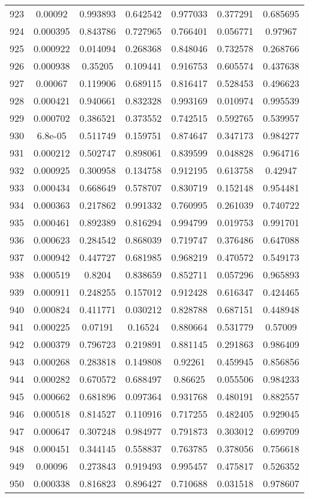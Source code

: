 \begin{table}
\begin{tabular}{c|c|c|c|c|c|c}
923 & 0.00092 & 0.993893 & 0.642542 & 0.977033 & 0.377291 & 0.685695\\
924 & 0.000395 & 0.843786 & 0.727965 & 0.766401 & 0.056771 & 0.97967\\
925 & 0.000922 & 0.014094 & 0.268368 & 0.848046 & 0.732578 & 0.268766\\
926 & 0.000938 & 0.35205 & 0.109441 & 0.916753 & 0.605574 & 0.437638\\
927 & 0.00067 & 0.119906 & 0.689115 & 0.816417 & 0.528453 & 0.496623\\
928 & 0.000421 & 0.940661 & 0.832328 & 0.993169 & 0.010974 & 0.995539\\
929 & 0.000702 & 0.386521 & 0.373552 & 0.742515 & 0.592765 & 0.539957\\
930 & 6.8e-05 & 0.511749 & 0.159751 & 0.874647 & 0.347173 & 0.984277\\
931 & 0.000212 & 0.502747 & 0.898061 & 0.839599 & 0.048828 & 0.964716\\
932 & 0.000925 & 0.300958 & 0.134758 & 0.912195 & 0.613758 & 0.42947\\
933 & 0.000434 & 0.668649 & 0.578707 & 0.830719 & 0.152148 & 0.954481\\
934 & 0.000363 & 0.217862 & 0.991332 & 0.760995 & 0.261039 & 0.740722\\
935 & 0.000461 & 0.892389 & 0.816294 & 0.994799 & 0.019753 & 0.991701\\
936 & 0.000623 & 0.284542 & 0.868039 & 0.719747 & 0.376486 & 0.647088\\
937 & 0.000942 & 0.447727 & 0.681985 & 0.968219 & 0.470572 & 0.549173\\
938 & 0.000519 & 0.8204 & 0.838659 & 0.852711 & 0.057296 & 0.965893\\
939 & 0.000911 & 0.248255 & 0.157012 & 0.912428 & 0.616347 & 0.424465\\
940 & 0.000824 & 0.411771 & 0.030212 & 0.828788 & 0.687151 & 0.448948\\
941 & 0.000225 & 0.07191 & 0.16524 & 0.880664 & 0.531779 & 0.57009\\
942 & 0.000379 & 0.796723 & 0.219891 & 0.881145 & 0.291863 & 0.986409\\
943 & 0.000268 & 0.283818 & 0.149808 & 0.92261 & 0.459945 & 0.856856\\
944 & 0.000282 & 0.670572 & 0.688497 & 0.86625 & 0.055506 & 0.984233\\
945 & 0.000662 & 0.681896 & 0.097364 & 0.931768 & 0.480191 & 0.882557\\
946 & 0.000518 & 0.814527 & 0.110916 & 0.717255 & 0.482405 & 0.929045\\
947 & 0.000647 & 0.307248 & 0.984977 & 0.791873 & 0.303012 & 0.699709\\
948 & 0.000451 & 0.344145 & 0.558837 & 0.763785 & 0.378056 & 0.756618\\
949 & 0.00096 & 0.273843 & 0.919493 & 0.995457 & 0.475817 & 0.526352\\
950 & 0.000338 & 0.816823 & 0.896427 & 0.710688 & 0.031518 & 0.978607\\
\end{tabular}
\end{table}
